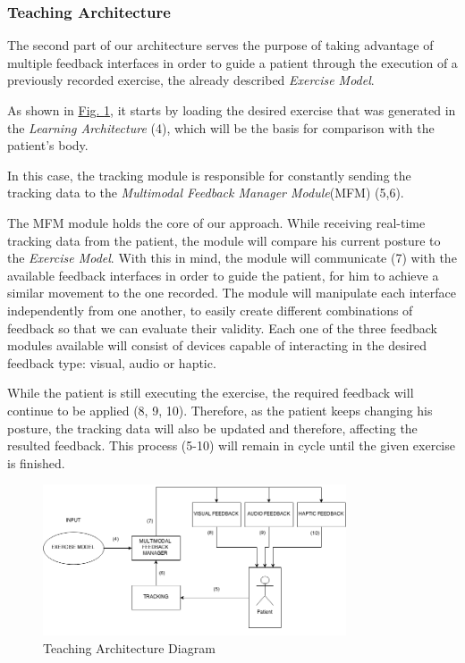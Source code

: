 \subsubsection{Teaching Architecture}

The second part of our architecture serves the purpose of taking advantage of 
multiple feedback interfaces in order to guide a patient through 
the execution of a previously recorded exercise, the already described \emph{Exercise Model}.

As shown in \hyperref[fig:teaching]{Fig. \ref{fig:teaching}}, it starts by 
loading the desired exercise that was generated in the \emph{Learning Architecture} (4), which will be the basis for comparison with the patient's body.

In this case, the tracking module is responsible for constantly sending the tracking data to the \emph{Multimodal Feedback Manager Module}(MFM) (5,6).

The \ac{MFM} module holds the core of our approach. While receiving real-time tracking data from the patient, the module will compare his current posture to the \emph{Exercise Model}.
With this in mind, the module will communicate (7) with the available feedback interfaces in order to guide the patient, for him to achieve a similar movement to the one recorded.
The module will manipulate each interface independently from one another, to easily create different combinations of feedback so that we can evaluate their validity.
Each one of the three feedback modules available will consist of devices capable of interacting in the desired feedback type: visual, audio or haptic. 

While the patient is still executing the exercise, the required feedback will continue to be applied (8, 9, 10). Therefore, as the patient keeps changing his posture, the tracking data will also be updated and therefore, affecting the resulted feedback.
This process (5-10) will remain in cycle until the given exercise is finished.


\begin{figure}
	\centering
	\includegraphics[width=0.8\textwidth]{imgs/TeachingPhase}
	\caption{Teaching Architecture Diagram}
	\label{fig:teaching}
\end{figure}